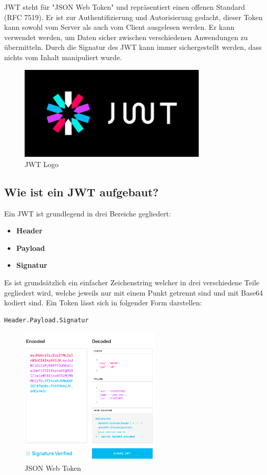 JWT steht für "JSON Web Token" und repräsentiert einen offenen Standard (RFC 7519). Er ist zur Authentifizierung und Autorisierung gedacht, dieser Token kann sowohl vom Server als auch vom Client ausgelesen werden. Er kann verwendet werden, um Daten sicher zwischen verschiedenen Anwendungen zu übermitteln. Durch die Signatur des JWT kann immer sichergestellt werden, dass nichts vom Inhalt manipuliert wurde.

\begin{figure}[h]
    \centering
    \includegraphics[width=0.8\textwidth]{pics/jwt-logo.png}
    \caption{JWT Logo}
\end{figure}


\subsection{Wie ist ein JWT aufgebaut?}
Ein JWT ist grundlegend in drei Bereiche gegliedert:

\begin{itemize}
\item \textbf{Header}
\item \textbf{Payload}
\item \textbf{Signatur}
\end{itemize}

Es ist grundsätzlich ein einfacher Zeichenstring welcher in drei verschiedene Teile gegliedert wird, welche jeweils nur mit einem Punkt getrennt sind und mit Base64 kodiert sind. Ein Token lässt sich in folgender Form darstellen:

\begin{lstlisting}
Header.Payload.Signatur
\end{lstlisting}


\begin{figure}[h!]
    \centering
    \includegraphics[width=0.6\textwidth]{pics/jwt.png}
    \caption{JSON Web Token}
    \label{fig:enter-label}
\end{figure}

